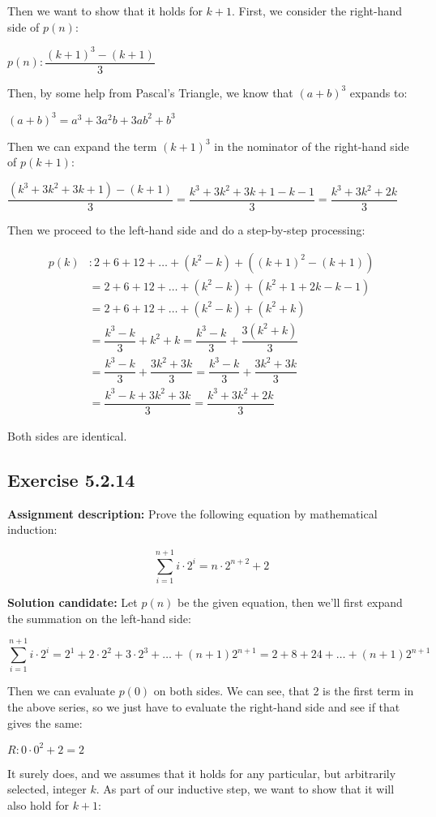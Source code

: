 \documentclass{report}
\newcommand{\cent}[1]{\begin{center}#1\end{center}}
\newcommand{\mAlign}[1]{\begin{align*}#1\end{align*}}
\newcommand{\AssignmentDescription}{\textbf{Assignment description: }}
\newcommand{\Solution}{\textbf{Solution candidate: }}
\newcommand{\QED}{\boxed{}}
\newcommand{\Exercise}[1]{\subsection{Exercise #1}}
\begin{document}
 	Then we want to show that it holds for $k+1$. First, we consider the right-hand side of $p(n)$:
 	
 	\cent{$p(n) :  \dfrac{(k+1)^3-(k+1)}{3}$}
 	
 	Then, by some help from Pascal's Triangle, we know that $(a+b)^3$ expands to:
 	\cent{$(a+b)^3 = a^3 + 3a^2b + 3ab^2 + b^3$}
 	
 	Then we can expand the term $(k+1)^3$ in the nominator of the right-hand side of $p(k+1)$:
 	
 	\cent{$ \dfrac{(k^3 + 3k^2 + 3k + 1) - (k+1)}{3} = \dfrac{k^3 + 3k^2 + 3k + 1 - k - 1}{3} = \dfrac{k^3 + 3k^2 + 2k}{3}$}
 	
 	Then we proceed to the left-hand side and do a step-by-step processing:
 	
 	\mAlign{
 		p(k) &:  2+6+12+ \dots + (k^2-k) + ((k+1)^2 -(k+1)) \\
 		&= 2+6+12+ \dots + (k^2-k) + (k^2+1+2k -k-1) \\
 		&= 2+6+12+ \dots + (k^2-k) + (k^2+k)\\
 		&= \dfrac{k^3-k}{3} + k^2+k = \dfrac{k^3-k}{3} + \dfrac{3(k^2+k)}{3} \\
 		&= \dfrac{k^3-k}{3} + \dfrac{3k^2 + 3k}{3} = \dfrac{k^3-k}{3} + \dfrac{3k^2 + 3k}{3} \\
 		&= \dfrac{k^3-k + 3k^2 + 3k}{3} = \dfrac{k^3 + 3k^2 + 2k}{3}
 	}
 	
 	Both sides are identical.\\
 	
 	\QED
 	\Exercise{5.2.14}
 	
 	\AssignmentDescription
 	Prove the following equation by mathematical induction:
 	
 	\cent{$$\sum_{i=1}^{n+1} i\cdot 2^i= n \cdot 2^{n+2}+2 $$}
 	
 	\Solution
 	Let $p(n)$ be the given equation, then we'll first expand the summation on the left-hand side:
 	 
 	\cent{$$\sum_{i=1}^{n+1} i\cdot 2^i = 2^1 + 2 \cdot 2^2 + 3 \cdot 2^3 + \dots + (n+1) 2^{n+1} = 2 + 8 + 24 + \dots + (n+1) 2^{n+1} $$}
 	
 	Then we can evaluate $p(0)$ on both sides. We can see, that 2 is the first term in the above series, so we just have to evaluate the right-hand side and see if that gives the same:
 	
 	\cent{$R : 0 \cdot 0^2 + 2 = 2$}
 	
 	It surely does, and we assumes that it holds for any particular, but arbitrarily selected, integer $k $. As part of our inductive step, we want to show that it will also hold for $k+1$:
 	
\end{document}
